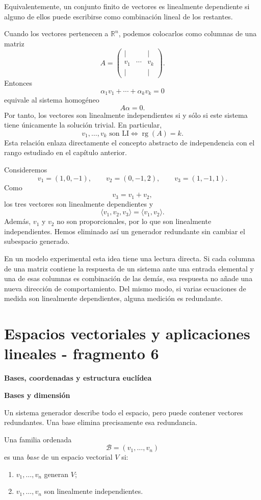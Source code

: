 Equivalentemente, un conjunto finito de vectores es linealmente dependiente si alguno de ellos puede escribirse como combinación lineal de los restantes.

Cuando los vectores pertenecen a $\mathbb{R}^n$, podemos colocarlos como columnas de una matriz
\[
A=\begin{pmatrix}|&&|\\v_1&\cdots&v_k\\|&&|\end{pmatrix}.
\]
Entonces
\[
\alpha_1v_1+\cdots+\alpha_kv_k=0
\]
equivale al sistema homogéneo
\[
A\alpha=0.
\]
Por tanto, los vectores son linealmente independientes si y sólo si este sistema tiene únicamente la solución trivial. En particular,
\[
\boxed{v_1,\ldots,v_k\text{ son LI}\iff \operatorname{rg}(A)=k.}
\]
Esta relación enlaza directamente el concepto abstracto de independencia con el rango estudiado en el capítulo anterior.

\begin{example}
Consideremos
\[
v_1=(1,0,-1),\qquad
v_2=(0,-1,2),\qquad
v_3=(1,-1,1).
\]
Como
\[
v_3=v_1+v_2,
\]
los tres vectores son linealmente dependientes y
\[
\langle v_1,v_2,v_3\rangle
=
\langle v_1,v_2\rangle.
\]
Además, $v_1$ y $v_2$ no son proporcionales, por lo que son linealmente independientes. Hemos eliminado así un generador redundante sin cambiar el subespacio generado.
\end{example}

En un modelo experimental esta idea tiene una lectura directa. Si cada columna de una matriz contiene la respuesta de un sistema ante una entrada elemental y una de esas columnas es combinación de las demás, esa respuesta no añade una nueva dirección de comportamiento. Del mismo modo, si varias ecuaciones de medida son linealmente dependientes, alguna medición es redundante.


\section{Espacios vectoriales y aplicaciones lineales - fragmento 6}
\textbf{Bases, coordenadas y estructura euclídea}

\textbf{Bases y dimensión}

Un sistema generador describe todo el espacio, pero puede contener vectores redundantes. Una base elimina precisamente esa redundancia.

\begin{definition}[Base]
Una familia ordenada
\[
\mathcal B=(v_1,\ldots,v_n)
\]
es una \emph{base} de un espacio vectorial $V$ si:
\begin{enumerate}
\item $v_1,\ldots,v_n$ generan $V$;
\item $v_1,\ldots,v_n$ son linealmente independientes.
\end{enumerate}
\end{definition}

